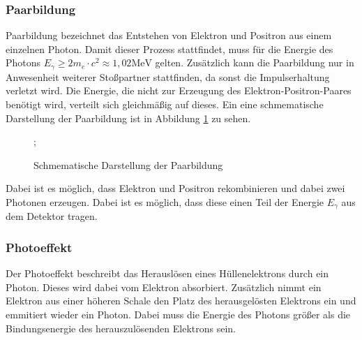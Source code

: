 \subsubsection{Paarbildung}
Paarbildung bezeichnet das Entstehen von Elektron und Positron aus einem einzelnen Photon. Damit dieser Prozess stattfindet, muss für die Energie des Photons $E_\gamma \ge 2m_e \cdot c^2 \approx 1,02 \mathrm{MeV}$ gelten. Zusätzlich kann die Paarbildung nur in Anwesenheit weiterer Stoßpartner stattfinden, da sonst die Impulserhaltung verletzt wird. Die Energie, die nicht zur Erzeugung des Elektron-Positron-Paares benötigt wird, verteilt sich gleichmäßig auf dieses. 
Ein eine schmematische Darstellung der Paarbildung ist in Abbildung \ref{fig:pair} zu sehen.
\begin{figure}[H]
\centering
{};
\caption{Schmematische Darstellung der Paarbildung}
\label{fig:pair}
\end{figure}
Dabei ist es möglich, dass Elektron und Positron rekombinieren und dabei zwei Photonen erzeugen. Dabei ist es möglich, dass diese einen Teil der Energie $E_\gamma$ aus dem Detektor tragen. 

\subsubsection{Photoeffekt}
Der Photoeffekt beschreibt das Herauslösen eines Hüllenelektrons durch ein Photon. Dieses wird dabei vom Elektron absorbiert. Zusätzlich nimmt ein Elektron aus einer höheren Schale den Platz des herausgelösten Elektrons ein und emmitiert wieder ein Photon.
Dabei muss die Energie des Photons größer als die Bindungsenergie des herauszulösenden Elektrons sein.
